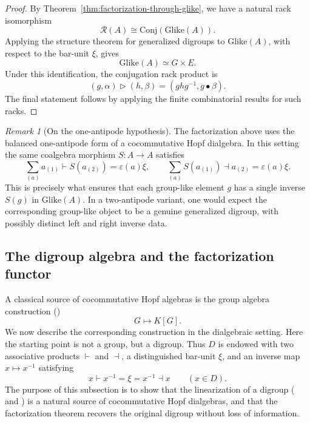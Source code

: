 \documentclass[11pt]{article}
\theoremstyle{plain}
\theoremstyle{definition}
\theoremstyle{remark}
\newtheorem{remark}[theorem]{Remark}
\begin{document}
	\begin{proof}
		By Theorem~\ref{thm:factorization-through-glike}, we have a natural rack
		isomorphism
		\[
		\mathcal{R}(A)
		\cong
		\mathrm{Conj}(\mathrm{Glike}(A)).
		\]
		Applying the structure theorem for generalized digroups to
		\(\mathrm{Glike}(A)\), with respect to the bar-unit \(\xi\), gives
		\[
		\mathrm{Glike}(A)\simeq G\times E.
		\]
		Under this identification, the conjugation rack product is
		\[
		(g,\alpha)\triangleright(h,\beta)
		=
		(ghg^{-1},g\bullet\beta).
		\]
		The final statement follows by applying the finite combinatorial results
		for such racks.
	\end{proof}
	
	\begin{remark}[On the one-antipode hypothesis]\label{rem:one-antipode-hypothesis}
		The factorization above uses the balanced one-antipode form of a
		cocommutative Hopf dialgebra. In this setting the same coalgebra morphism
		\(S:A\to A\) satisfies
		\[
		\sum_{(a)}a_{(1)}\vdash S(a_{(2)})=\varepsilon(a)\xi,
		\qquad
		\sum_{(a)}S(a_{(1)})\dashv a_{(2)}=\varepsilon(a)\xi.
		\]
		This is precisely what ensures that each group-like element \(g\) has a
		single inverse \(S(g)\) in \(\mathrm{Glike}(A)\). In a two-antipode
		variant, one would expect the corresponding group-like object to be a
		genuine generalized digroup, with possibly distinct left and right inverse
		data.
	\end{remark}
	
	\subsection{The digroup algebra and the factorization functor}
	
	A classical source of cocommutative Hopf algebras is the group algebra construction (\cite[Part I (2.3)]{Jantzen2003})
	\[
	G\longmapsto K[G].
	\]
	We now describe the corresponding construction in the dialgebraic setting.
	Here the starting point is not a group, but a digroup. Thus \(D\) is endowed
	with two associative products \(\vdash\) and \(\dashv\), a distinguished
	bar-unit \(\xi\), and an inverse map \(x\mapsto x^{-1}\) satisfying
	\[
	x\vdash x^{-1}=\xi=x^{-1}\dashv x
	\qquad
	(x\in D).
	\]
	The purpose of this subsection is to show that the linearization of a digroup (\cite[Section 4]{RSV} and \cite{RSSV})
	is a natural source of cocommutative Hopf dialgebras, and that the
	factorization theorem recovers the original digroup without loss of
	information.
	
\end{document}
